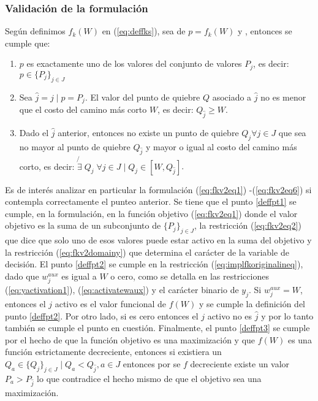\documentclass{article}
\begin{document}
  \subsubsection*{Validación de la formulación}

  Según definimos $f_k(W)$ en (\ref{eq:deffks}), sea de $p = f_k(W)$ y , entonces se cumple que:

  \begin{enumerate}
    \item {\label{deffpt1} $p$ es exactamente uno de los valores del conjunto de valores $P_j$, es decir: $p \in \{P_j\}_{j \in J}$}
    \item {\label{deffpt2} Sea $\hat{j} = j \;|\; p = P_j$. El valor del punto de quiebre $Q$ asociado a $\hat{j}$ no es menor que el costo del camino más corto $W$, es decir: $Q_{\hat{j}} \geq W$.}
    \item {\label{deffpt3} Dado el $\hat{j}$ anterior, entonces no existe un punto de quiebre $Q_j \forall j \in J$ que sea no mayor al punto de quiebre $Q_{\hat{j}}$ y mayor o igual al costo del camino más corto, es decir: $\not{\exists}\; Q_j\; \forall j \in J \;|\; Q_j \in  [W, Q_{\hat{j}}]$}.
  \end{enumerate}

  Es de interés analizar en particular la formulación (\ref{eq:fkv2eq1}) -(\ref{eq:fkv2eq6}) si contempla correctamente el punteo anterior. Se tiene que el punto \ref{deffpt1} se cumple, en la formulación, en la función objetivo (\ref{eq:fkv2eq1}) donde el valor objetivo es la suma de un subconjunto de $\{P_j\}_{j \in J}$, la restricción (\ref{eq:fkv2eq2}) que dice que solo uno de esos valores puede estar activo en la suma del objetivo y la restricción (\ref{eq:fkv2domainy}) que determina el carácter de la variable de decisión. El punto \ref{deffpt2} se cumple en la restricción (\ref{eq:implfkoriginalineq}), dado que $w^{aux}_j$ es igual a $W$ o cero, como se detalla en las restricciones (\ref{eq:yactivation1}), (\ref{eq:activatewaux}) y el carácter binario de $y_j$. Si $w^{aux}_j = W$, entonces el $j$ activo es el valor funcional de $f(W)$ y se cumple la definición del punto \ref{deffpt2}. Por otro lado, si es cero entonces el $j$ activo no es $\hat{j}$ y por lo tanto también se cumple el punto en cuestión. Finalmente, el punto \ref{deffpt3} se cumple por el hecho de que la función objetivo es una maximización y que $f(W)$ es una función estrictamente decreciente, entonces si existiera un $Q_a \in \{Q_j\}_{j \in J} \;|\; Q_a < Q_{\hat{j}}, a \in J$ entonces por se $f$ decreciente existe un valor $P_a > P_{\hat{j}}$ lo que contradice el hecho mismo de que el objetivo sea una maximización.
\end{document}
